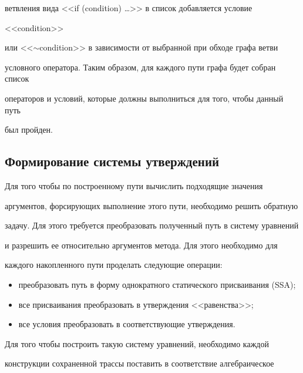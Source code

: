 ветвления вида <<if (condition) \ldots>> в список добавляется условие


<<condition>>


или <<$\sim$condition>> в зависимости от выбранной при обходе графа ветви


условного оператора. Таким образом, для каждого пути графа будет собран список


операторов и условий, которые должны выполниться для того, чтобы данный путь


был пройден.





      \vspace*{-6pt}





      \subsection{Формирование системы утверждений}





     Для того чтобы по построенному пути вычислить подходящие значения


аргументов, форсирующих выполнение этого пути, необходимо решить обратную


задачу. Для этого требуется преобразовать полученный путь в систему уравнений


и разрешить ее относительно аргументов метода. Для этого необходимо для


каждого накопленного пути проделать следующие операции:


     \begin{itemize}


\item преобразовать путь в форму однократного статического присваивания (SSA);


\item все присваивания преобразовать в утверждения <<равенства>>;


\item все условия преобразовать в соответствующие утверждения.


\end{itemize}





     Для того чтобы построить такую систему уравнений, необходимо каждой


конструкции сохраненной трассы поставить в соответствие алгебраическое


